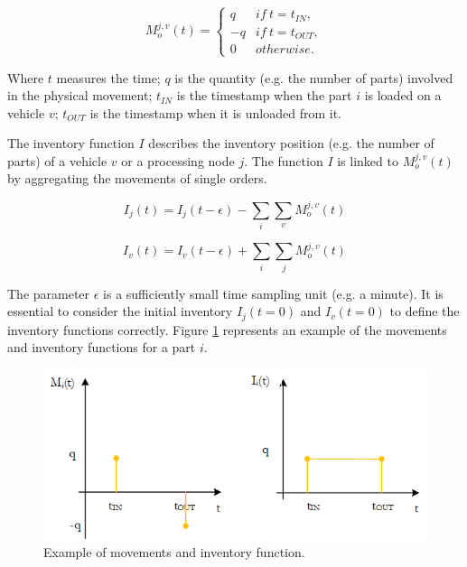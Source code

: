 \begin{equation}
M_o^{j,v}(t) =\left\{
                \begin{array}{ll}
                 q & if \  t=t_{IN}, \\
                -q & if \  t=t_{OUT}, \\
                0 & otherwise.
                \end{array}
              \right.
\label{eq_movements}
\end{equation}

Where $t$ measures the time; $q$ is the quantity (e.g. the number of parts) involved in the physical movement; $t_{IN}$ is the timestamp when the part $i$ is loaded on a vehicle $v$; $t_{OUT}$ is the timestamp when it is unloaded from it.\par

The inventory function $I$ describes the inventory position (e.g. the number of parts) of a vehicle $v$ or a processing node $j$. The function $I$ is linked to $M_o^{j,v}(t)$ by aggregating the movements of single orders.\par

\begin{equation}
I_j(t) = I_j(t-\epsilon) -\sum_{i}\sum_{v}M_o^{j,v}(t) 
\label{eqInvj}
\end{equation}

\begin{equation}
I_v(t) = I_v(t-\epsilon) +\sum_{i}\sum_{j}M_o^{j,v}(t) 
\label{eqInvv}
\end{equation}

The parameter $\epsilon$ is a sufficiently small time sampling unit (e.g. a minute). It is essential to consider the initial inventory $I_j(t=0)$ and $I_v(t=0)$ to define the inventory functions correctly. Figure \ref{fig_movementsInventory} represents an example of the movements and inventory functions for a part $i$. 

\begin{figure}[hbt!]
\centering
\includegraphics[width=1\textwidth]{SectionIntroduction/informationFramework_figures/fig_movementsInventory.png}
\captionsetup{type=figure}
\caption{Example of movements and inventory function.}
\label{fig_movementsInventory}
\end{figure}

